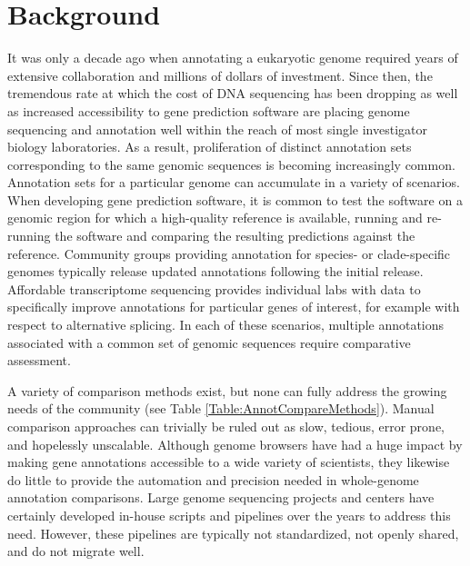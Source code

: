 \section{Background}
It was only a decade ago when annotating a eukaryotic genome required years of extensive collaboration and millions of dollars of investment.
Since then, the tremendous rate at which the cost of DNA sequencing has been dropping as well as increased accessibility to gene prediction software are placing genome sequencing and annotation well within the reach of most single investigator biology laboratories.
As a result, proliferation of distinct annotation sets corresponding to the same genomic sequences is becoming increasingly common.
Annotation sets for a particular genome can accumulate in a variety of scenarios.
When developing gene prediction software, it is common to test the software on a genomic region for which a high-quality reference is available, running and re-running the software and comparing the resulting predictions against the reference.
Community groups providing annotation for species- or clade-specific genomes typically release updated annotations following the initial release.
Affordable transcriptome sequencing provides individual labs with data to specifically improve annotations for particular genes of interest, for example with respect to alternative splicing.
In each of these scenarios, multiple annotations associated with a common set of genomic sequences require comparative assessment.

A variety of comparison methods exist, but none can fully address the growing needs of the community (see Table \ref{Table:AnnotCompareMethods}).
Manual comparison approaches can trivially be ruled out as slow, tedious, error prone, and hopelessly unscalable.
Although genome browsers have had a huge impact by making gene annotations accessible to a wide variety of scientists, they likewise do little to provide the automation and precision needed in whole-genome annotation comparisons.
Large genome sequencing projects and centers have certainly developed in-house scripts and pipelines over the years to address this need.
However, these pipelines are typically not standardized, not openly shared, and do not migrate well.

